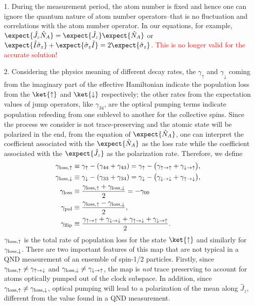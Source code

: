 \documentclass[]{report}
\newcommand{\gammauu}{\gamma_{\uparrow \rightarrow \uparrow}}
\newcommand{\gammadd}{\gamma_{\downarrow \rightarrow \downarrow}}
\newcommand{\gammaud}{\gamma_{\uparrow \rightarrow \downarrow}}
\newcommand{\gammadu}{\gamma_{\downarrow \rightarrow \uparrow}}
\begin{document}
1. During the measurement period, the atom number is fixed and hence one can ignore the quantum nature of atom number operators--that is no fluctuation and correlations with the atom number operator. In our equations, for example, $ \expect{\hat{J}_z\hat{N}_A}=\expect{\hat{J}_z}\expect{\hat{N}_A} $ or $ \expect{\hat{I}\hat{\sigma}_z}+\expect{\hat{\sigma}_z\hat{I}}=2\expect{\hat{\sigma}_z} $. \textcolor{red}{This is no longer valid for the accurate solution!}

2. Considering the physics meaning of different decay rates, the $ \gamma_\uparrow $ and $ \gamma_\downarrow $ coming from the imaginary part of the effective Hamiltonian indicate the population loss from the $ \ket{\uparrow} $ and $ \ket{\downarrow} $ respectively; the other rates from the expectation values of jump operators, like $ \gamma_{34} $, are the optical pumping terms indicate population refeeding from one sublevel to another for the collective spins. Since the process we consider is not trace-preserving and the atomic state will be polarized in the end, from the equation of $ \expect{\hat{N}_A} $, one can interpret the coefficient associated with the $ \expect{\hat{N}_A} $ as the loss rate while the coefficient associated with the $ \expect{\hat{J}_z} $ as the polarization rate. Therefore, we define
\begin{align}
\gamma_{\rm{loss},\uparrow} &\equiv \gamma_\uparrow - (\gamma_{44}+\gamma_{43})=\gamma_\uparrow - \big(\gammauu + \gammadu \big), \\
\gamma_{\rm{loss},\downarrow} &\equiv \gamma_\downarrow - (\gamma_{33}+\gamma_{34})=\gamma_\downarrow - \big(\gammadd + \gammaud \big),\\
\gamma_{\rm loss} &\equiv \frac{\gamma_{\rm{loss},\uparrow} +\gamma_{\rm{loss},\downarrow}}{2}=-\gamma_{00}\\
\gamma_{\rm pol} &\equiv \frac{\gamma_{\rm{loss},\uparrow} - \gamma_{\rm{loss},\downarrow}}{2},\\
\gamma_{\rm flip} &\equiv \frac{\gammauu + \gammadd + \gammaud + \gammadu}{2}.
\end{align}
$ \gamma_{\rm{loss},\uparrow} $ is the total rate of population loss for the state $\ket{\uparrow}$ and similarly for $\gamma_{\rm{loss},\downarrow}$.
There are two important features of this map that are not typical in a QND measurement of an ensemble of spin-1/2 particles.  Firstly, since $\gamma_{\rm{loss},\uparrow} \neq \gamma_{\uparrow \rightarrow \downarrow}$ and  $\gamma_{\rm{loss},\downarrow} \neq \gamma_{\downarrow \rightarrow \uparrow}$, the map is {\em not} trace preserving to account for atoms optically pumped out of the clock subspace.  
In addition, since $\gamma_{\rm{loss},\uparrow} \neq \gamma_{\rm{loss},\downarrow}$, optical pumping will lead to a polarization of the mean along $\hat{J}_z$, different from the value found in a QND measurement.
\end{document}
